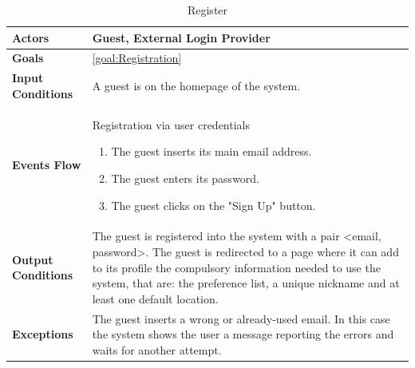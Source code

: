 \begin{table}[H]
	
	\centering
	\def\arraystretch{1.5}
	\begin{tabular}{|p{7cm}|p{7cm}|}
		\hline
		\textbf{Actors}            & Guest, External Login Provider		    \\ \hline
		\textbf{Goals}             & \ref{goal:Registration}           \\ \hline
		\textbf{Input Conditions}  & A guest is on the homepage of the system.           \\ \hline
		\textbf{Events Flow}       &   
		Registration via user credentials
		\begin{enumerate}
			\item The guest inserts its main email address.
			\item The guest enters its password.
			\item The guest clicks on the "Sign Up" button.
		\end{enumerate}    \\ \hline
		\textbf{Output Conditions} & The guest is registered into the system with a pair <email, password>. The guest is redirected to a page where it can add to its profile the compulsory information needed to use the system, that are: the preference list, a unique nickname and at least one default location.      \\ \hline
		\textbf{Exceptions}        & The guest inserts a wrong or already-used email. In this case the system shows the user a message reporting the errors and waits for another attempt.            \\ \hline
	\end{tabular}
	\caption{Register\label{UseCaseDescr:Registration}}
\end{table}

